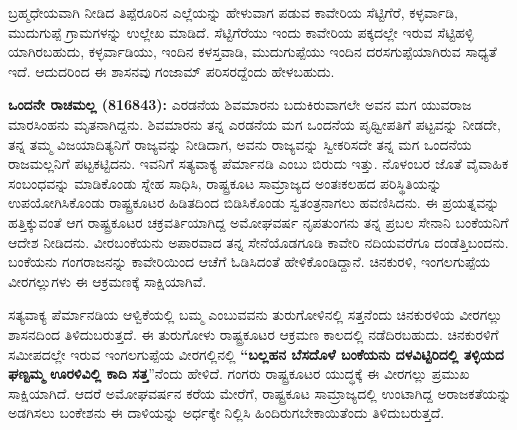 ಬ್ರಹ್ಮಧೇಯವಾಗಿ ನೀಡಿದ ತಿಪ್ಪೆರೂರಿನ ಎಲ್ಲೆಯನ್ನು ಹೇಳುವಾಗ ಪಡುವ ಕಾವೇರಿಯ ಸೆಟ್ಟಿಗೆರೆ, ಕಳ್ಳರ್ವಾಡಿ, ಮುದುಗುಪ್ಪೆ ಗ್ರಾಮಗಳನ್ನು ಉಲ್ಲೇಖ ಮಾಡಿದೆ. ಸೆಟ್ಟಿಗೆರೆಯು ಇಂದು ಕಾವೇರಿಯ ಪಕ್ಕದಲ್ಲೇ ಇರುವ ಸೆಟ್ಟಿಹಳ್ಳಿ ಯಾಗಿರಬಹುದು, ಕಳ್ಳರ್ವಾಡಿಯು, ಇಂದಿನ ಕಳಸ್ತವಾಡಿ, ಮುದುಗುಪ್ಪೆಯು ಇಂದಿನ ದರಸಗುಪ್ಪೆಯಾಗಿರುವ ಸಾಧ್ಯತೆ ಇದೆ. ಆದುದರಿಂದ ಈ ಶಾಸನವು ಗಂಜಾಮ್ ಪರಿಸರದ್ದೆಂದು ಹೇಳಬಹುದು. 

\textbf{ಒಂದನೇ ರಾಚಮಲ್ಲ (816843):} ಎರಡನೆಯ ಶಿವಮಾರನು ಬದುಕಿರುವಾಗಲೇ ಅವನ ಮಗ ಯುವರಾಜ ಮಾರಸಿಂಹನು ಮೃತನಾಗಿದ್ದನು. ಶಿವಮಾರನು ತನ್ನ ಎರಡನೆಯ ಮಗ ಒಂದನೆಯ ಪೃಥ್ವೀಪತಿಗೆ ಪಟ್ಟವನ್ನು ನೀಡದೇ, ತನ್ನ ತಮ್ಮ ವಿಜಯಾದಿತ್ಯನಿಗೆ ರಾಜ್ಯವನ್ನು ನೀಡಿದಾಗ, ಅವನು ರಾಜ್ಯವನ್ನು ಸ್ವೀಕರಿಸದೇ ತನ್ನ ಮಗ ಒಂದನೆಯ ರಾಜಮಲ್ಲನಿಗೆ ಪಟ್ಟಕಟ್ಟಿದನು. ಇವನಿಗೆ ಸತ್ಯವಾಕ್ಯ ಪೆರ್ಮಾನಡಿ ಎಂಬು ಬಿರುದು ಇತ್ತು. ನೊಳಂಬರ ಜೊತೆ ವೈವಾಹಿಕ ಸಂಬಂಧವನ್ನು ಮಾಡಿಕೊಂಡು ಸ್ನೇಹ ಸಾಧಿಸಿ, ರಾಷ್ಟ್ರಕೂಟ ಸಾಮ್ರಾಜ್ಯದ ಅಂತಃಕಲಹದ ಪರಿಸ್ಥಿತಿಯನ್ನು ಉಪಯೋಗಿಸಿಕೊಂಡು ರಾಷ್ಟ್ರಕೂಟರ ಹಿಡಿತದಿಂದ ಬಿಡಿಸಿಕೊಂಡು ಸ್ವತಂತ್ರನಾಗಲು ಹವಣಿಸಿದನು. ಈ ಪ್ರಯತ್ನವನ್ನು ಹತ್ತಿಕ್ಕುವಂತೆ ಆಗ ರಾಷ್ಟ್ರಕೂಟರ ಚಕ್ರವರ್ತಿಯಾಗಿದ್ದ ಅಮೋಘವರ್ಷ ನೃಪತುಂಗನು ತನ್ನ ಪ್ರಬಲ ಸೇನಾನಿ ಬಂಕೆಯನಿಗೆ ಆದೇಶ ನೀಡಿದನು. ವೀರಬಂಕೆಯನು ಅಪಾರವಾದ ತನ್ನ ಸೇನೆಯೊಡಗೂಡಿ ಕಾವೇರಿ ನದಿಯವರೆಗೂ ದಂಡೆತ್ತಿಬಂದನು. ಬಂಕೆಯನು ಗಂಗರಾಜನನ್ನು ಕಾವೇರಿಯಿಂದ ಆಚೆಗೆ ಓಡಿಸಿದಂತೆ ಹೇಳಿಕೊಂಡಿದ್ದಾನೆ. ಚಿನಕುರಳಿ, ಇಂಗಲಗುಪ್ಪೆಯ ವೀರಗಲ್ಲುಗಳು ಈ ಆಕ್ರಮಣಕ್ಕೆ ಸಾಕ್ಷಿಯಾಗಿವೆ. 

ಸತ್ಯವಾಕ್ಯ ಪೆರ್ಮಾನಡಿಯ ಆಳ್ವಿಕೆಯಲ್ಲಿ ಬಮ್ಮ ಎಂಬುವವನು ತುರುಗೋಳಿನಲ್ಲಿ ಸತ್ತನೆಂದು ಚಿನಕುರಳಿಯ ವೀರಗಲ್ಲು ಶಾಸನದಿಂದ ತಿಳಿದುಬರುತ್ತದೆ. ಈ ತುರುಗೋಳು ರಾಷ್ಟ್ರಕೂಟರ ಆಕ್ರಮಣ ಕಾಲದಲ್ಲಿ ನಡೆದಿರಬಹುದು. ಚಿನಕುರಳಿಗೆ ಸಮೀಪದಲ್ಲೇ ಇರುವ ಇಂಗಲಗುಪ್ಪೆಯ ವೀರಗಲ್ಲಿನಲ್ಲಿ \textbf{“ಬಲ್ಲಹನ ಬೆಸದೊಳೆ ಬಂಕೆಯನು ದಳವಿಟ್ಟಿರಿದಲ್ಲಿ ತಳ್ಳಿಯದ ಘಣ್ಟಮ್ಮ ಊರಳಿವಿಲ್ಲಿ ಕಾದಿ ಸತ್ತ}”ನೆಂದು ಹೇಳಿದೆ. ಗಂಗರು ರಾಷ್ಟ್ರಕೂಟರ ಯುದ್ಧಕ್ಕೆ ಈ ವೀರಗಲ್ಲು ಪ್ರಮುಖ ಸಾಕ್ಷಿಯಾಗಿದೆ. ಆದರೆ ಅಮೋಘವರ್ಷನ ಕರೆಯ ಮೇರೆಗೆ, ರಾಷ್ಟ್ರಕೂಟ ಸಾಮ್ರಾಜ್ಯದಲ್ಲಿ ಉಂಟಾಗಿದ್ದ ಅರಾಜಕತೆಯನ್ನು ಅಡಗಿಸಲು ಬಂಕೇಶನು ಈ ದಾಳಿಯನ್ನು ಅರ್ಧಕ್ಕೇ ನಿಲ್ಲಿಸಿ ಹಿಂದಿರುಗಬೇಕಾಯಿತೆಂದು ತಿಳಿದುಬರುತ್ತದೆ.

